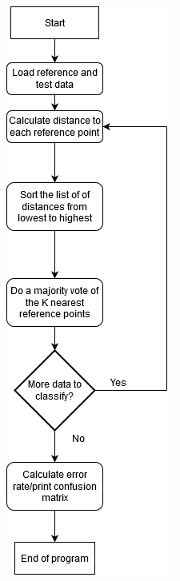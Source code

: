 \documentclass{article}
\begin{document}
\begin{figure}
\centering
\begin{minipage}[t]{.5\textwidth}
  \centering
  \includegraphics[scale=0.6]{images/flow_KNN.png}
  \label{fig:flow_1}
\end{minipage}%
\begin{minipage}[t]{.5\textwidth}
  \centering

\end{minipage}
\end{figure}
\end{document}
